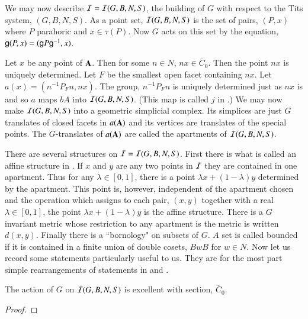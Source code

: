We may now describe $\mathcal{I} = \mathcal{I}(G, B, N, S)$, the building of $G$ with respect to the Tits system, $(G, B, N, S)$. As a point set, $\mathcal{I}(G, B, N, S)$ is the set of pairs, $(P, x)$ where $P$ parahoric and $x \in \tau(P)$. Now $G$ acts on this set by the equation, $\mathsf{g} (P, x) = (\mathsf{g} P \mathsf{g}^{-1}, x)$. 

Let $x$ be any point of $\mathbf{A}$. Then for some $n \in N$, $nx \in \overline{C}_{0}$. Then the point $nx$ is uniquely determined. Let $F$ be the smallest open facet containing $nx$.  Let $a(x) = (n^{-1} P_{F}n, nx)$. The group, $n^{-1}P_{F}n$ is uniquely determined just as $nx$ is and so $a$ maps $bA$ into $\mathcal{I}(G, B, N, S)$. (This map is called $j$ in \cite{art6-keyBT I}.) We may now make $\mathcal{I}(G, B, N, S)$ into a geometric simplicial complex. Its simplices are just $G$ translates of closed facets in $a(\mathbf{A})$ and its vertices are translates of the special points. The $G$-translates of $a(\mathbf{A})$ are called the apartments of $\mathcal{I}(G, B, N, S)$.

There are several structures on $\mathcal{I} = \mathcal{I}(G, B, N, S)$. First there is what is called an affine structure in \cite{art6-keyBT I}. If $x$ and $y$ are any two points in $\mathcal{I}$ they are contained in one apartment. Thus for any $\lambda \in [0,1]$, there is a  point $\lambda x + (1- \lambda)y$ determined by the apartment. This point is, however, independent of the apartment chosen and the operation which assigns to each pair, $(x, y)$ together with a real $\lambda \in [0,1]$, the point $\lambda x + (1-\lambda)y$ is the affine structure. There is a $G$ invariant metric whose restriction to any apartment is the metric is written $d(x, y)$. Finally there is a ``bornology" on subsets of $G$. $A$ set is called bounded if it is contained in a finite union of double cosets, $BwB$ for $w \in N$. Now let us record some statements particularly useful to us. They are for the most part simple rearrangements of statements in \cite{BT I} and \cite{BT II}. 

\begin{lem}\label{art6-lemma-10.1}
The action of $G$ on $\mathcal{I}(G, B, N, S)$ is excellent with section, $\overline{C}_{0}$.
\end{lem}

\begin{proof}


\end{proof}
